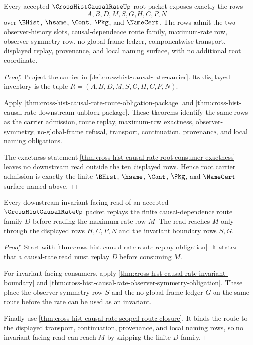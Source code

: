 \begin{theorem}
\label{thm:cross-hist-causal-rate-root-carrier-admission}
Every accepted $\CrossHistCausalRateUp$ root packet exposes exactly the rows
$$
A,B,D,M,S,G,H,C,P,N
$$
over $\BHist$, $\hsame$, $\Cont$, $\Pkg$, and $\NameCert$. The rows admit the two observer-history slots, causal-dependence route family, maximum-rate row, observer-symmetry row, no-global-frame ledger, componentwise transport, displayed replay, provenance, and local naming surface, with no additional root coordinate.
\end{theorem}
\begin{proof}
Project the carrier in \autoref{def:cross-hist-causal-rate-carrier}. Its displayed inventory is the tuple $R=(A,B,D,M,S,G,H,C,P,N)$.

Apply \autoref{thm:cross-hist-causal-rate-route-obligation-package} and \autoref{thm:cross-hist-causal-rate-downstream-unblock-package}. These theorems identify the same rows as the carrier admission, route replay, maximum-row exactness, observer-symmetry, no-global-frame refusal, transport, continuation, provenance, and local naming obligations.

The exactness statement \autoref{thm:cross-hist-causal-rate-root-consumer-exactness} leaves no downstream read outside the ten displayed rows. Hence root carrier admission is exactly the finite $\BHist$, $\hsame$, $\Cont$, $\Pkg$, and $\NameCert$ surface named above.
\end{proof}

\begin{theorem}
\label{thm:cross-hist-causal-rate-root-route-replay}
Every downstream invariant-facing read of an accepted $\CrossHistCausalRateUp$ packet replays the finite causal-dependence route family $D$ before reading the maximum-rate row $M$. The read reaches $M$ only through the displayed rows $H,C,P,N$ and the invariant boundary rows $S,G$.
\end{theorem}
\begin{proof}
Start with \autoref{thm:cross-hist-causal-rate-route-replay-obligation}. It states that a causal-rate read must replay $D$ before consuming $M$.

For invariant-facing consumers, apply \autoref{thm:cross-hist-causal-rate-invariant-boundary} and \autoref{thm:cross-hist-causal-rate-observer-symmetry-obligation}. These place the observer-symmetry row $S$ and the no-global-frame ledger $G$ on the same route before the rate can be used as an invariant.

Finally use \autoref{thm:cross-hist-causal-rate-scoped-route-closure}. It binds the route to the displayed transport, continuation, provenance, and local naming rows, so no invariant-facing read can reach $M$ by skipping the finite $D$ family.
\end{proof}

